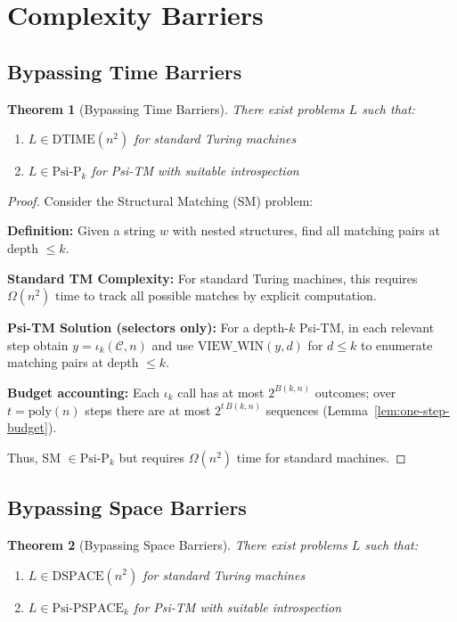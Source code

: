 \documentclass[11pt]{article}
\newtheorem{theorem}{Theorem}
\begin{document}
\section{Complexity Barriers}

\subsection{Bypassing Time Barriers}

\begin{theorem}[Bypassing Time Barriers]
There exist problems $L$ such that:
\begin{enumerate}
\item $L \in \text{DTIME}(n^2)$ for standard Turing machines
\item $L \in \text{Psi-P}_k$ for Psi-TM with suitable introspection
\end{enumerate}
\end{theorem}

\begin{proof}
Consider the Structural Matching (SM) problem:

\textbf{Definition:} Given a string $w$ with nested structures, find all matching pairs at depth $\leq k$.

\textbf{Standard TM Complexity:}
For standard Turing machines, this requires $\Omega(n^2)$ time to track all possible matches by explicit computation.

\textbf{Psi-TM Solution (selectors only):}
For a depth-$k$ Psi-TM, in each relevant step obtain $y=\iota_k(\mathcal{C},n)$ and use $\mathrm{VIEW\_WIN}(y,d)$ for $d\le k$ to enumerate matching pairs at depth $\le k$.

\textbf{Budget accounting:}
Each $\iota_k$ call has at most $2^{B(k,n)}$ outcomes; over $t=\mathrm{poly}(n)$ steps there are at most $2^{t\,B(k,n)}$ sequences (Lemma~\ref{lem:one-step-budget}).

Thus, SM $\in \text{Psi-P}_k$ but requires $\Omega(n^2)$ time for standard machines.
\end{proof}

\subsection{Bypassing Space Barriers}

\begin{theorem}[Bypassing Space Barriers]
There exist problems $L$ such that:
\begin{enumerate}
\item $L \in \text{DSPACE}(n^2)$ for standard Turing machines
\item $L \in \text{Psi-PSPACE}_k$ for Psi-TM with suitable introspection
\end{enumerate}
\end{theorem}
\end{document}
